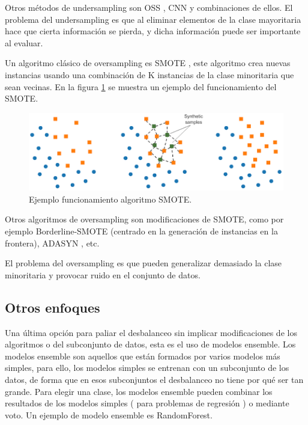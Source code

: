 Otros métodos de undersampling son OSS \cite{kubat1997addressing}, CNN \cite{hart1968condensed} y combinaciones de ellos. El problema del undersampling es que al eliminar elementos de la clase mayoritaria hace que cierta información se pierda, y dicha información puede ser importante al evaluar.\newline

Un algoritmo clásico de oversampling es SMOTE \cite{chawla2002smote}, este algoritmo crea nuevas instancias usando una combinación de K instancias de la clase minoritaria que sean vecinas. En la figura \ref{fig:29} se muestra un ejemplo del funcionamiento del SMOTE.\newline

\begin{figure}[h]
	\centering
	\includegraphics[width=120mm]{imagenes/smote-example.png}
	\caption{Ejemplo funcionamiento algoritmo SMOTE.}
	\label{fig:29}
\end{figure}
\verticalspace

Otros algoritmos de oversampling son modificaciones de SMOTE, como por ejemplo Borderline-SMOTE \cite{han2005borderline} (centrado en la generación de instancias en la frontera), ADASYN \cite{he2008adasyn}, etc.\newline

El problema del oversampling es que pueden generalizar demasiado la clase minoritaria y provocar ruido en el conjunto de datos.

\subsection{Otros enfoques}
Una última opción para paliar el desbalanceo sin implicar modificaciones de los algoritmos o del subconjunto de datos, esta es el uso de modelos ensemble. Los modelos ensemble son aquellos que están formados por varios modelos más simples, para ello, los modelos simples se entrenan con un subconjunto de los datos, de forma que en esos subconjuntos el desbalanceo no tiene por qué ser tan grande. Para elegir una clase, los modelos ensemble pueden combinar los resultados de los modelos simples ( para problemas de regresión ) o mediante voto. Un ejemplo de modelo ensemble es RandomForest.